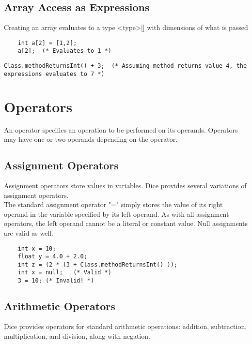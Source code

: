 \begin{homeworkProblem}
	\subsection{Array Access as Expressions}
	Creating an array evaluates to a type \textless type\textgreater[] with dimensions of what is passed
	\begin{verbatim}
	int a[2] = [1,2];
	a[2];  (* Evaluates to 1 *)
	\end{verbatim}
	
	
	\begin{verbatim}
Class.methodReturnsInt() + 3;  (* Assuming method returns value 4, the expressions evaluates to 7 *)
	\end{verbatim}
	
	\section{Operators}
		
	An operator specifies an operation to be performed on its operands. Operators may have one or two operands depending on the operator. 
	
	\subsection{Assignment Operators}
		
	Assignment operators store values in variables. Dice provides several variations of assignment operators.\\
		
	The standard assignment operator "=" simply stores the value of its right operand in the variable specified by its left operand. As with all assignment operators, the left operand cannot be a literal or constant value. Null assignments are valid as well.
		
	\begin{verbatim}
	int x = 10;
	float y = 4.0 + 2.0;
	int z = (2 * (3 + Class.methodReturnsInt() ));
	int x = null;   (* Valid *)
	3 = 10; (* Invalid! *)
	\end{verbatim}
	
	\subsection{Arithmetic Operators}
	
	Dice provides operators for standard arithmetic operations: addition, subtraction, multiplication, and division, along with negation.
	

\end{homeworkProblem}
